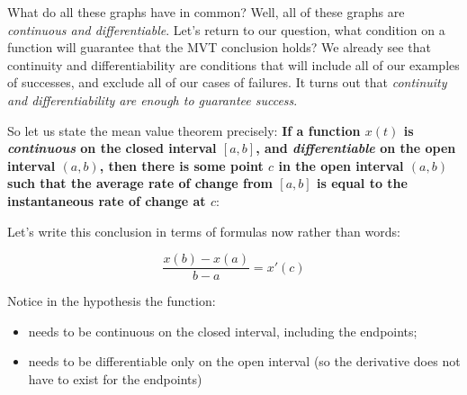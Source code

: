 \documentclass[pdftex, brazil, 12pt, twoside]{article}
\begin{document}
What do all these graphs have in common?
Well, all of these graphs are \emph{continuous and differentiable}.
Let's return to our question, what condition on a function
will guarantee that the MVT conclusion holds?
We already see that continuity and differentiability
are conditions that will include all
of our examples of successes, and exclude
all of our cases of failures.
It turns out that \emph{continuity and differentiability are
  enough to guarantee success}.

So let us state the mean value theorem precisely:
\textbf{If a function $x(t)$ is \emph{continuous}
on the closed interval $[a, b]$, and
\emph{differentiable} on the open interval $(a, b)$,
then there is some point $c$ in the open interval
$(a, b)$ such that the average rate of change from $[a, b]$
is equal to the instantaneous rate of change at $c$}:

\begin{figure}[H]
  \begin{center}
    \label{fig:mvt-hypot-10}
  \end{center}
\end{figure}

Let's write this conclusion in terms of formulas
now rather than words:

\begin{equation}
  \frac{x(b) - x(a)}{b - a} = x'(c)
\end{equation}

Notice in the hypothesis the function:

\begin{itemize}[noitemsep]
\item needs to be continuous on the closed interval, including
  the endpoints;
\item needs to be differentiable only on the open interval (so the
  derivative does not have to exist for the endpoints)
\end{itemize}
\end{document}
